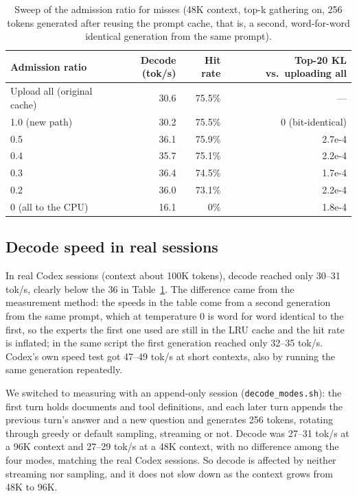 \documentclass[11pt,a4paper]{article}
\newcommand{\code}[1]{\texttt{#1}}
\newcommand{\tps}{tok/s}
\begin{document}
\begin{table}[h]
  \centering
  \small
  \caption{Sweep of the admission ratio for misses (48K context, top-k gathering on, 256 tokens generated after reusing the prompt cache, that is, a second, word-for-word identical generation from the same prompt).}
  \label{tab:admit}
  \begin{tabular}{@{}l r r r@{}}
    \toprule
    Admission ratio & Decode (\tps) & Hit rate & Top-20 KL vs.\ uploading all \\
    \midrule
    Upload all (original cache) & 30.6 & 75.5\% & --- \\
    1.0 (new path) & 30.2 & 75.5\% & 0 (bit-identical) \\
    0.5 & 36.1 & 75.9\% & 2.7e-4 \\
    0.4 & 35.7 & 75.1\% & 2.2e-4 \\
    0.3 & 36.4 & 74.5\% & 1.7e-4 \\
    0.2 & 36.0 & 73.1\% & 2.2e-4 \\
    0 (all to the CPU) & 16.1 & 0\% & 1.8e-4 \\
    \bottomrule
  \end{tabular}
\end{table}

\subsection{Decode speed in real sessions}
\label{sec:realdecode}

In real Codex sessions (context about 100K tokens), decode reached only 30--31 \tps{}, clearly below the 36 in Table~\ref{tab:admit}. The difference came from the measurement method: the speeds in the table come from a second generation from the same prompt, which at temperature 0 is word for word identical to the first, so the experts the first one used are still in the LRU cache and the hit rate is inflated; in the same script the first generation reached only 32--35 \tps{}. Codex's own speed test got 47--49 \tps{} at short contexts, also by running the same generation repeatedly.

We switched to measuring with an append-only session (\code{decode\_modes.sh}): the first turn holds documents and tool definitions, and each later turn appends the previous turn's answer and a new question and generates 256 tokens, rotating through greedy or default sampling, streaming or not. Decode was 27--31 \tps{} at a 96K context and 27--29 \tps{} at a 48K context, with no difference among the four modes, matching the real Codex sessions. So decode is affected by neither streaming nor sampling, and it does not slow down as the context grows from 48K to 96K.
\end{document}
